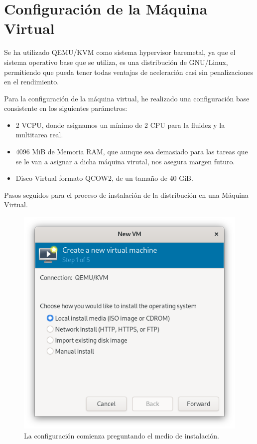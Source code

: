 
\section{Configuración de la Máquina Virtual}

Se ha utilizado QEMU/KVM como sistema hypervisor baremetal, ya que el sistema operativo base que se utiliza, es una distribución de GNU/Linux, permitiendo que pueda tener todas ventajas de aceleración casi sin penalizaciones en el rendimiento.
\vspace{5mm}

Para la configuración de la máquina virtual, he realizado una configuración base consistente en los siguientes parámetros:

\begin{itemize}
\item 2 VCPU, donde asignamos un mínimo de 2 CPU para la fluidez y la multitarea real.
\item 4096 MiB de Memoria RAM, que aunque sea demasiado para las tareas que se le van a asignar a dicha máquina virutal, nos asegura margen futuro.
\item Disco Virtual formato QCOW2, de un tamaño de 40 GiB. 
\end{itemize}

Pasos seguidos para el proceso de instalación de la distribución en una Máquina Virtual.

\begin{figure}[H]
	\centering
	\includegraphics[scale=0.40]{00}
	\caption{La configuración comienza preguntando el medio de instalación.}
\end{figure}

